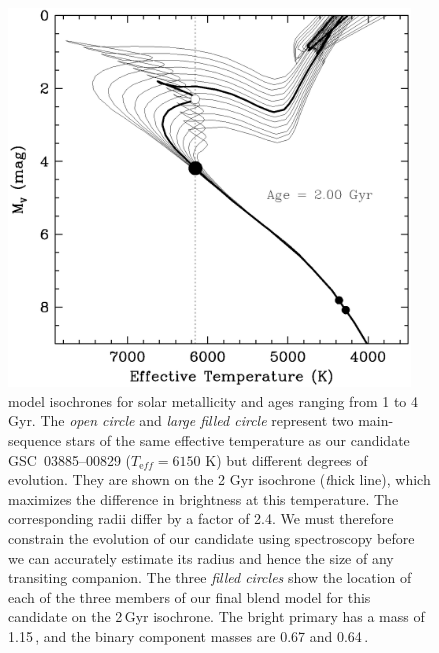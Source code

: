 \begin{figure}
\begin{center}
\includegraphics[width=0.95\textwidth]{3_f2}
\caption[Location of blend model components on isochrones]{\citet{Girardi_Bressan_Bertelli:aas:2000a} model isochrones
  for solar metallicity and ages ranging from 1 to 4 Gyr.
  The \textit{open circle} and \textit{large filled circle} represent two main-sequence stars of the same effective temperature as our candidate
  \mbox{GSC 03885--00829} ($T_{\mathrm eff} = 6150$ K) but different
  degrees of evolution. They are shown on the 2 Gyr isochrone ({\textit thick
  line}), which maximizes the difference in brightness at this
  temperature. The corresponding radii differ by a factor of 2.4. We
  must therefore constrain the evolution of our candidate using
  spectroscopy before we can accurately estimate its radius and hence
  the size of any transiting companion. The three \textit{filled circles} show
  the location of each of the three members of our final blend model
  for this candidate on the 2\,Gyr isochrone. The bright primary has a
  mass of 1.15\,\msun, and the binary component masses are
  0.67 and 0.64\,\msun.}\label{cha:gsc:fig:isochrones}
\end{center}
\end{figure}

